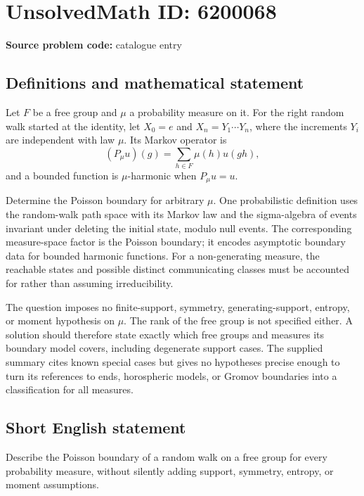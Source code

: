 \documentclass[11pt]{article}
\begin{document}
\section*{UnsolvedMath ID: 6200068}
\textbf{Source problem code:} catalogue entry
\subsection{Definitions and mathematical statement}
Let $F$ be a free group and $\mu$ a probability measure on it. For the right random walk started at the identity, let $X_0=e$ and $X_n=Y_1\cdots Y_n$, where the increments $Y_i$ are independent with law $\mu$. Its Markov operator is
\[
(P_\mu u)(g)=\sum_{h\in F}\mu(h)u(gh),
\]
and a bounded function is $\mu$-harmonic when $P_\mu u=u$.

Determine the Poisson boundary for arbitrary $\mu$. One probabilistic definition uses the random-walk path space with its Markov law and the sigma-algebra of events invariant under deleting the initial state, modulo null events. The corresponding measure-space factor is the Poisson boundary; it encodes asymptotic boundary data for bounded harmonic functions. For a non-generating measure, the reachable states and possible distinct communicating classes must be accounted for rather than assuming irreducibility.

The question imposes no finite-support, symmetry, generating-support, entropy, or moment hypothesis on $\mu$. The rank of the free group is not specified either. A solution should therefore state exactly which free groups and measures its boundary model covers, including degenerate support cases. The supplied summary cites known special cases but gives no hypotheses precise enough to turn its references to ends, horospheric models, or Gromov boundaries into a classification for all measures.
\subsection{Short English statement}
Describe the Poisson boundary of a random walk on a free group for every probability measure, without silently adding support, symmetry, entropy, or moment assumptions.
\end{document}
